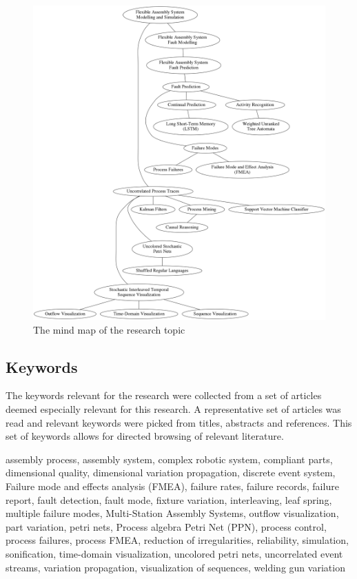 \documentclass[a4paper,10pt]{article}
\begin{document}
\begin{figure}[ht]
\begin{center}
 \includegraphics[width=\textwidth]{./field.png}
\end{center}
\caption{The mind map of the research topic}
\end{figure} 

\subsection{Keywords}

The keywords relevant for the research were collected from a set of articles deemed especially relevant for this research. A representative set of articles was
read and relevant keywords were picked from titles, abstracts and references. This set of keywords allows for directed browsing of relevant literature.

assembly process, assembly system, complex robotic system, compliant parts, dimensional quality, dimensional variation propagation, discrete event system,
Failure mode and effects analysis (FMEA), failure rates, failure records, failure report, fault detection, fault mode, fixture variation, interleaving,
leaf spring, multiple failure modes, Multi-Station Assembly Systems, outflow visualization,
part variation, petri nets, Process algebra Petri Net (PPN), process control, process failures, process FMEA, reduction of irregularities, reliability,
simulation, sonification, time-domain visualization, uncolored petri nets, uncorrelated event streams, variation propagation, visualization of sequences,
welding gun variation
\end{document}
